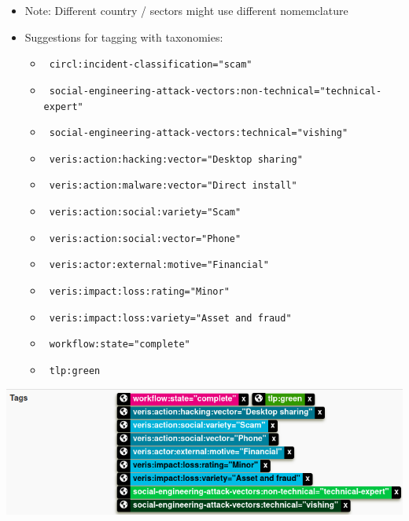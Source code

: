 \begin{frame}
    \begin{itemize}
        \item Note: Different country / sectors might use different nomemclature
        \item Suggestions for tagging with taxonomies:
        \begin{itemize}
            \item \texttt{\color{black} circl:incident-classification="scam"}
            \item \texttt{\color{black} \tiny social-engineering-attack-vectors:non-technical="technical-expert"}
            \item \texttt{\color{black} \tiny social-engineering-attack-vectors:technical="vishing"}
            \item \texttt{\color{black} veris:action:hacking:vector="Desktop sharing"}
            \item \texttt{\color{black} veris:action:malware:vector="Direct install"}
            \item \texttt{\color{black} veris:action:social:variety="Scam"}
            \item \texttt{\color{black} veris:action:social:vector="Phone"}
            \item \texttt{\color{black} veris:actor:external:motive="Financial"}
            \item \texttt{\color{black} veris:impact:loss:rating="Minor"}
            \item \texttt{\color{black} veris:impact:loss:variety="Asset and fraud"}
            \item \texttt{\color{black} workflow:state="complete"}
            \item \texttt{\color{black} tlp:green}
        \end{itemize}
    \end{itemize}
\end{frame}

\begin{frame}
    \includegraphics[width=1.0\linewidth]{pictures/case1/event-tags.png}
\end{frame}

